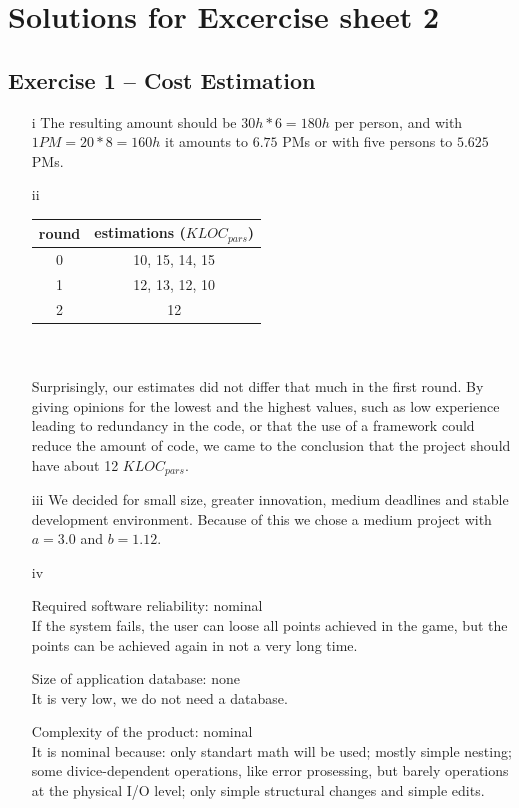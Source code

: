 \documentclass{scrartcl}
\begin{document}
\section*{Solutions for Excercise sheet 2}

\subsection*{Exercise 1 – Cost Estimation}
\begin{itemize}
	\item[i]
	The resulting amount should be $30h*6=180h$ per person, and with $1 PM=20*8=160h$ it amounts to $6.75$ PMs or with five persons to $5.625$ PMs.\\
	\item[ii]
	\begin{tabular} {| c | c |}
		round & estimations ($KLOC_{pars}$)\\
		\hline
		0 & 10, 15, 14, 15 \\
		1 & 12, 13, 12, 10\\
		2 & 12\\
	\end{tabular}\\\\
	Surprisingly, our estimates did not differ that much in the first round.
	By giving opinions for the lowest and the highest values, such as low experience leading to redundancy in the code, or that the use of a framework could reduce the amount of code, we came to the conclusion that the project should have about 12 $KLOC_{pars}$.
	\item[iii]
	We decided for small size, greater innovation, medium deadlines and stable development environment. Because of this we chose a medium project with $a=3.0$ and $b=1.12$.\\
	\item[iv]
		\item[]Required software reliability: nominal \\ If the system fails, the user can loose all points achieved in the game, but the points can be achieved again in not a very long time.
		\item[]Size of application database:  none \\
		It is very low, we do not need a database.
		\item[]Complexity of the product:  nominal \\
		It is nominal because: only standart math will be used; mostly simple nesting; some divice-dependent operations, like error prosessing, but barely operations at the physical I/O level; only simple structural changes and simple edits.

\end{itemize}
\end{document}
